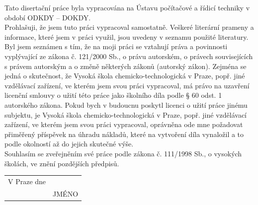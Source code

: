 
\clearpage
\thispagestyle{empty} 
 \vspace*{1cm}
 \noindent 
 Tato disertační práce byla vypracována na Ústavu počítačové a řídicí techniky
v období ODKDY -- DOKDY. \\ [30mm]
Prohlašuji, že jsem tuto práci vypracoval samostatně. Veškeré literární prameny
a informace, které jsem v práci využil, jsou uvedeny v seznamu použité literatury. \\ [8mm]
Byl jsem seznámen s tím, že na moji práci se vztahují práva a povinnosti vyplývající
ze zákona č. 121/2000 Sb., o právu autorském, o právech souvisejících s právem
autorským a o změně některých zákonů (autorský zákon). Zejména se jedná
o skutečnost, že Vysoká škola chemicko-technologická v Praze, popř. jiné vzdělávací
zařízení, ve kterém jsem svou práci vypracoval, má právo na uzavření licenční
smlouvy o užití této práce jako školního díla podle § 60 odst. 1 autorského zákona.
Pokud bych v budoucnu poskytl licenci o užití práce jinému subjektu, je Vysoká
škola chemicko-technologická v Praze, popř. jiné vzdělávací zařízení, ve kterém
jsem svou práci vypracoval, oprávněna ode mne požadovat přiměřený příspěvek
na úhradu nákladů, které na vytvoření díla vynaložil a to podle okolností až do
jejich skutečné výše. \\ [8mm]
\noindent
Souhlasím se zveřejněním své práce podle zákona č. 111/1998 Sb., o vysokých
školách, ve znění pozdějších předpisů. \\ [30mm]


\noindent\begin{tabular}{@{}p{2.5in}p{}@{}}
\hspace{1cm} V Praze dne                      &\hspace{2cm} \dotfill\\
             & \multicolumn{1}{c}{\hphantom{hhhhHHHHH}JMÉNO}\\
\end{tabular} 

 
\cleardoublepage
\thispagestyle{empty}

